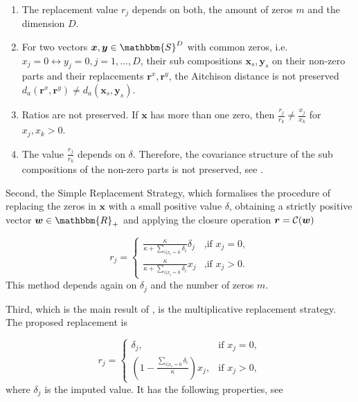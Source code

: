 \begin{enumerate}
	\item The replacement value $r_j$ depends on both, the amount of zeros $m$ and the dimension $D$.
	\item For two vectors $\bm{x},\bm{y} \in \mathbbm{S}^D$ with common zeros, i.e. $x_j= 0 \leftrightarrow y_j=0, j=1,\ldots,D$, their sub compositions $\bm{x}_s,\bm{y}_s$  on their non-zero parts and their replacements $\bm{r}^x,\bm{r}^y$, the Aitchison distance is not preserved $d_a(\bm{r}^x,\bm{r}^y) \neq d_a(\bm{x}_s,\bm{y}_s)$. 
	\item Ratios are not preserved. If $\bm{x}$ has more than one zero, then $\frac{r_j}{r_k} \neq \frac{x_j}{x_k}$ for $x_j,x_k > 0$.
	\item The value $\frac{r_j}{r_k}$ depends on $\delta$. Therefore, the covariance structure of the sub compositions of the non-zero parts is not preserved, see \textcite{Josep:2003}.
\end{enumerate}

Second, the Simple Replacement Strategy, which formalises the procedure of replacing the zeros in $\bm{x}$ with a small positive value $\delta$, obtaining a strictly positive vector $\bm{w} \in \mathbbm{R}_+$ and applying the closure operation $\bm{r}=\mathcal{C}(\bm{w})$

\begin{equation}
r_j = 
\begin{cases}
\frac{\kappa}{\kappa + \sum_{i| x_i=0}\delta_i } \delta_j & \text{,if } x_j=0, \\
\frac{\kappa}{\kappa + \sum_{i| x_i=0}\delta_i } x_j & \text{,if } x_j>0.
\end{cases}
\label{eq:simple replacement strategy}
\end{equation}
%
This method depends again on $\delta_j$ and the number of zeros $m$. 

Third, which is the main result of \textcite{Josep:2003}, is the multiplicative replacement strategy. The proposed replacement is 

\begin{equation}
r_j = 
\begin{cases}
\delta_j, & \text{if } x_j=0, \\
\left( 1- \frac{\sum_{i | x_i=0}\delta_i}{\kappa} \right)x_j, & \text{if } x_j>0, 
\end{cases}
\label{eq:multiplicative replacement strategy}
\end{equation}
%
where $\delta_j$ is the imputed value. It has the following properties, see \textcite{Josep:2003} 

